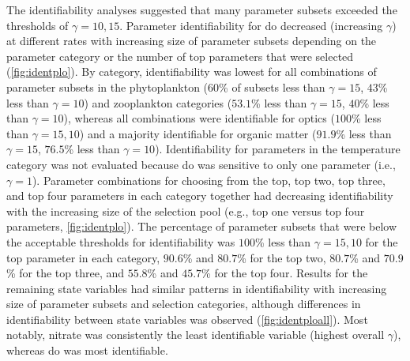 \documentclass[preprint]{elsarticle}\usepackage[]{graphicx}\usepackage[]{color}
\begin{document}
The identifiability analyses suggested that many parameter subsets exceeded the thresholds of $\gamma = 10, 15$.  Parameter identifiability for \ac{do} decreased (increasing $\gamma$) at different rates with increasing size of parameter subsets depending on the parameter category or the number of top parameters that were selected (\cref{fig:identplo}). By category, identifiability was lowest for all combinations of parameter subsets in the phytoplankton ($60$\% of subsets less than $\gamma = 15$, $43$\% less than $\gamma = 10$) and zooplankton categories ($53.1$\% less than $\gamma = 15$, $40$\% less than $\gamma = 10$), whereas all combinations were identifiable for optics ($100$\% less than $\gamma = 15, 10$) and a majority identifiable for organic matter ($91.9$\% less than $\gamma = 15$, $76.5$\% less than $\gamma = 10$). Identifiability for parameters in the temperature category was not evaluated because \ac{do} was sensitive to only one parameter (i.e., $\gamma = 1$). Parameter combinations for choosing from the top, top two, top three, and top four parameters in each category together had decreasing identifiability with the increasing size of the selection pool (e.g., top one versus top four parameters, \cref{fig:identplo}).  The percentage of parameter subsets that were below the acceptable thresholds for identifiability was $100$\% less than $\gamma = 15, 10$ for the top parameter in each category, $90.6$\% and $80.7$\% for the top two, $80.7$\% and $70.9$\% for the top three, and $55.8$\% and $45.7$\% for the top four.  Results for the remaining state variables had similar patterns in identifiability with increasing size of parameter subsets and selection categories, although differences in identifiability between state variables was observed (\cref{fig:identploall}).  Most notably, nitrate was consistently the least identifiable variable (highest overall $\gamma$), whereas \ac{do} was most identifiable.
\end{document}
